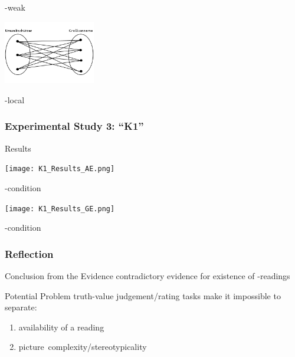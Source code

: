 \documentclass[fleqn,10pt,serif,xcolor=dvipsnames]{beamer}
\newcommand{\loc}{\acro{loc}}
\begin{document}
\begin{frame}
\begin{minipage}[t]{0.35\linewidth}
\begin{flushright}
      \vspace{-0.7cm}
      \begin{center}
        -weak
      \end{center}
      \includegraphics[width=4cm]{./../../pictures/Umweltschuetzer06.PNG}
      \vspace{-0.7cm}
      \begin{center}
        -local
      \end{center}
    \end{flushright}
  \end{minipage}
\end{frame}


\begin{frame}
  \frametitle{Experimental Study 3: ``K1''}
  \begin{block}{Results}
    \begin{minipage}[t]{0.45\linewidth}
      \vspace{0cm}
      \texttt{[image: K1\_Results\_AE.png]}
      \vspace{-0.6cm}
      \begin{center}
        -condition
      \end{center}
    \end{minipage}
    \hspace{0.3cm}
    \begin{minipage}[t]{0.45\linewidth}
      \vspace{0cm}
      \texttt{[image: K1\_Results\_GE.png]}
      \vspace{-0.6cm}
      \begin{center}
        -condition
      \end{center}
    \end{minipage}
  \end{block}
\end{frame}

\begin{frame}
  \frametitle{Reflection}
  
  \begin{block}{Conclusion from the Evidence}
    contradictory evidence for existence of \loc-readings
  \end{block}
  
  \begin{block}{Potential Problem}
    truth-value judgement/rating tasks make it impossible to separate:
      \begin{enumerate}
      \item availability of a reading
      \item picture~complexity/stereotypicality
      \end{enumerate}

  \end{block}

\end{frame}
\end{document}
